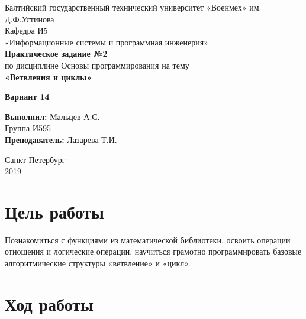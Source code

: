 \documentclass[a4paper,14pt]{extarticle}
\begin{document}
\begin{titlepage}
\centering
\small Балтийский государственный технический университет «Военмех» им. Д.Ф.Устинова \\
\vspace{3cm}
\normalsize Кафедра И5\\
«Информационные системы и программная инженерия»\\
\vspace{3cm}
\textbf{Практическое задание №2}\\
по дисциплине Основы программирования на тему\\ 
\textbf{«Ветвления и циклы»}\\
\begin{center}
{\large\bf Вариант 14}
\end{center}
\vfill

\begin{flushleft}
\textbf{Выполнил:}
\hfill {Мальцев А.С.} \\
\hfill {Группа И595} \\
\vspace{1cm}
\textbf{Преподаватель:}
\hfill {Лазарева Т.И.} \\
\end{flushleft}
\vspace{3cm}

{\centering Санкт-Петербург \\ 
\vspace{0.15cm}
2019}
\end{titlepage}

\section{Цель работы}
Познакомиться с функциями из математической библиотеки, освоить операции отношения и логические операции, научиться грамотно программировать базовые алгоритмические структуры «ветвление» и «цикл».

\section{Ход работы}
\end{document}
